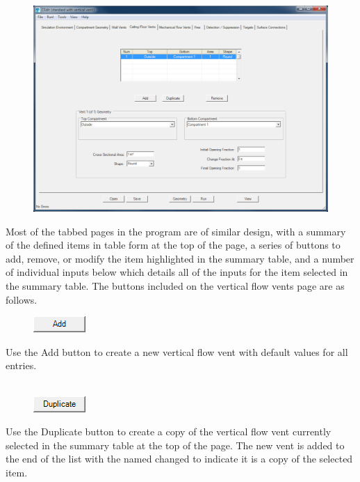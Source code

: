 \begin{figure}[h!]
\includegraphics[width=6.5in]{FIGURES/Input_File/Vertical_Flow_Tab}
\end{figure}
 
Most of the tabbed pages in the program are of similar design, with a summary of the defined items in table form at the top of the page, a series of buttons to add, remove, or modify the item highlighted in the summary table, and a number of individual inputs below which details all of the inputs for the item selected in the summary table. The buttons included on the vertical flow vents page are as follows.

\begin{figure}
  \includegraphics[width=0.781in]{FIGURES/Input_File/Add_Button}
\end{figure}

Use the Add button to create a new vertical flow vent with default values for all entries. \\~ \\

\begin{figure}
  \includegraphics[width=0.781in]{FIGURES/Input_File/Duplicate_Button}
\end{figure}

Use the Duplicate button to create a copy of the vertical flow vent currently selected in the summary table at the top of the page. The new vent is added to the end of the list with the named changed to indicate it is a copy of the selected item. \\

